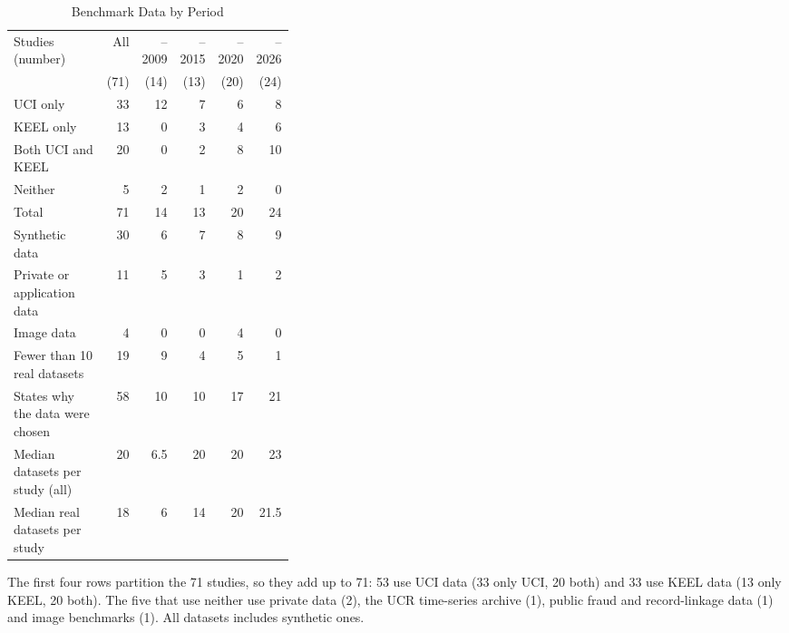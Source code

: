 \begin{table}[t]
  \caption{Benchmark Data by Period}
  \label{tab:empirical-data}
  \footnotesize
  \setlength{\tabcolsep}{4pt}
  \begin{tabular}{@{}>{\raggedright\arraybackslash}p{0.36\linewidth}rrrrr@{}}
    \toprule
    Studies (number) & All & --2009 & --2015 & --2020 & --2026\\
    & (71) & (14) & (13) & (20) & (24)\\
    \midrule
    UCI only & 33 & 12 & 7 & 6 & 8\\
    KEEL only & 13 & 0 & 3 & 4 & 6\\
    Both UCI and KEEL & 20 & 0 & 2 & 8 & 10\\
    Neither & 5 & 2 & 1 & 2 & 0\\
    Total & 71 & 14 & 13 & 20 & 24\\
    \midrule
    Synthetic data & 30 & 6 & 7 & 8 & 9\\
    Private or application data & 11 & 5 & 3 & 1 & 2\\
    Image data & 4 & 0 & 0 & 4 & 0\\
    Fewer than 10 real datasets & 19 & 9 & 4 & 5 & 1\\
    States why the data were chosen & 58 & 10 & 10 & 17 & 21\\
    \midrule
    Median datasets per study (all) & 20 & 6.5 & 20 & 20 & 23\\
    Median real datasets per study & 18 & 6 & 14 & 20 & 21.5\\
    \bottomrule
  \end{tabular}
  \par\smallskip\raggedright\scriptsize The first four rows partition the 71 studies, so they add up to 71: 53 use UCI data (33 only UCI, 20 both) and 33 use KEEL data (13 only KEEL, 20 both). The five that use neither use private data (2), the UCR time-series archive (1), public fraud and record-linkage data (1) and image benchmarks (1). All datasets includes synthetic ones.
\end{table}
